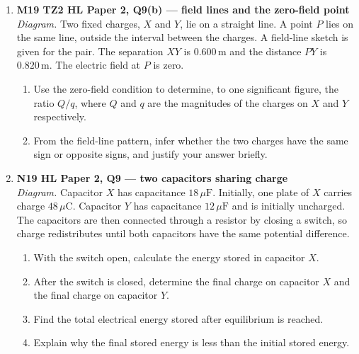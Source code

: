\documentclass[11pt]{article}
\begin{document}
\begin{enumerate}[leftmargin=*, itemsep=1.1em]
\item \textbf{M19 TZ2 HL Paper 2, Q9(b) --- field lines and the zero-field point}\\
\textit{Diagram.} Two fixed charges, $X$ and $Y$, lie on a straight line. A point $P$ lies on the same line, outside the interval between the charges. A field-line sketch is given for the pair. The separation $XY$ is $0.600\,\text{m}$ and the distance $PY$ is $0.820\,\text{m}$. The electric field at $P$ is zero.
\begin{enumerate}[label=(\alph*)]
\item Use the zero-field condition to determine, to one significant figure, the ratio $Q/q$, where $Q$ and $q$ are the magnitudes of the charges on $X$ and $Y$ respectively.
\item From the field-line pattern, infer whether the two charges have the same sign or opposite signs, and justify your answer briefly.
\end{enumerate}

\item \textbf{N19 HL Paper 2, Q9 --- two capacitors sharing charge}\\
\textit{Diagram.} Capacitor $X$ has capacitance $18\,\mu\text{F}$. Initially, one plate of $X$ carries charge $48\,\mu\text{C}$. Capacitor $Y$ has capacitance $12\,\mu\text{F}$ and is initially uncharged. The capacitors are then connected through a resistor by closing a switch, so charge redistributes until both capacitors have the same potential difference.
\begin{enumerate}[label=(\alph*)]
\item With the switch open, calculate the energy stored in capacitor $X$.
\item After the switch is closed, determine the final charge on capacitor $X$ and the final charge on capacitor $Y$.
\item Find the total electrical energy stored after equilibrium is reached.
\item Explain why the final stored energy is less than the initial stored energy.
\end{enumerate}


\end{enumerate}
\end{document}
